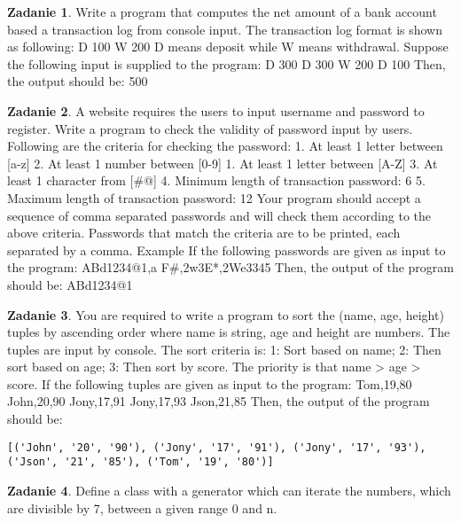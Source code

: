 \documentclass[11pt]{article}
\theoremstyle{definition}
\newtheorem{zadanie}{Zadanie}
\begin{document}
\begin{zadanie}
Write a program that computes the net amount of a bank account based a transaction log from console input. The transaction log format is shown as following:
D 100
W 200
D means deposit while W means withdrawal.
Suppose the following input is supplied to the program:
D 300
D 300
W 200
D 100
Then, the output should be:
500

\end{zadanie}

\begin{zadanie}
A website requires the users to input username and password to register. Write a program to check the validity of password input by users.
Following are the criteria for checking the password:
1. At least 1 letter between [a-z]
2. At least 1 number between [0-9]
1. At least 1 letter between [A-Z]
3. At least 1 character from [\#@]
4. Minimum length of transaction password: 6
5. Maximum length of transaction password: 12
Your program should accept a sequence of comma separated passwords and will check them according to the above criteria. Passwords that match the criteria are to be printed, each separated by a comma.
Example
If the following passwords are given as input to the program:
ABd1234@1,a F\#,2w3E*,2We3345
Then, the output of the program should be:
ABd1234@1

\end{zadanie}

\begin{zadanie}
You are required to write a program to sort the (name, age, height) tuples by ascending order where name is string, age and height are numbers. The tuples are input by console. The sort criteria is:
1: Sort based on name;
2: Then sort based on age;
3: Then sort by score.
The priority is that name > age > score.
If the following tuples are given as input to the program:
Tom,19,80
John,20,90
Jony,17,91
Jony,17,93
Json,21,85
Then, the output of the program should be:
\begin{verbatim}
[('John', '20', '90'), ('Jony', '17', '91'), ('Jony', '17', '93'), ('Json', '21', '85'), ('Tom', '19', '80')]
\end{verbatim}

\end{zadanie}

\begin{zadanie}
Define a class with a generator which can iterate the numbers, which are divisible by 7, between a given range 0 and n.

\end{zadanie}
\end{document}
